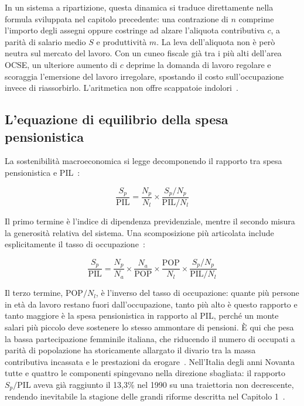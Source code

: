 In un sistema a ripartizione, questa dinamica si traduce direttamente nella formula sviluppata nel capitolo precedente: una contrazione di \(n\) comprime l'importo degli assegni oppure costringe ad alzare l'aliquota contributiva \(c\), a parità di salario medio \(S\) e produttività \(m\). La leva dell'aliquota non è però neutra sul mercato del lavoro. Con un cuneo fiscale già tra i più alti dell'area OCSE, un ulteriore aumento di \(c\) deprime la domanda di lavoro regolare e scoraggia l'emersione del lavoro irregolare, spostando il costo sull'occupazione invece di riassorbirlo. L'aritmetica non offre scappatoie indolori~\cite{Bosi2018, OCSE2023}.

\subsection{L'equazione di equilibrio della spesa pensionistica}

La sostenibilità macroeconomica si legge decomponendo il rapporto tra spesa pensionistica e PIL~\cite{RosenGayerRapallini2023}:

\[
\frac{S_p}{\text{PIL}} = \frac{N_p}{N_l} \times \frac{S_p / N_p}{\text{PIL} / N_l}
\]

Il primo termine è l'indice di dipendenza previdenziale, mentre il secondo misura la generosità relativa del sistema. Una scomposizione più articolata include esplicitamente il tasso di occupazione~\cite{Bosi2018}:

\[
\frac{S_p}{\text{PIL}} = \frac{N_p}{N_a} \times \frac{N_a}{\text{POP}} \times \frac{\text{POP}}{N_l} \times \frac{S_p / N_p}{\text{PIL} / N_l}
\]

Il terzo termine, \(\text{POP}/N_l\), è l'inverso del tasso di occupazione: quante più persone in età da lavoro restano fuori dall'occupazione, tanto più alto è questo rapporto e tanto maggiore è la spesa pensionistica in rapporto al PIL, perché un monte salari più piccolo deve sostenere lo stesso ammontare di pensioni. È qui che pesa la bassa partecipazione femminile italiana, che riducendo il numero di occupati a parità di popolazione ha storicamente allargato il divario tra la massa contributiva incassata e le prestazioni da erogare~\cite{RosenGayerRapallini2023}. Nell'Italia degli anni Novanta tutte e quattro le componenti spingevano nella direzione sbagliata: il rapporto \(S_p/\text{PIL}\) aveva già raggiunto il 13,3\% nel 1990 su una traiettoria non decrescente, rendendo inevitabile la stagione delle grandi riforme descritta nel Capitolo 1~\cite{Bosi2018}.

